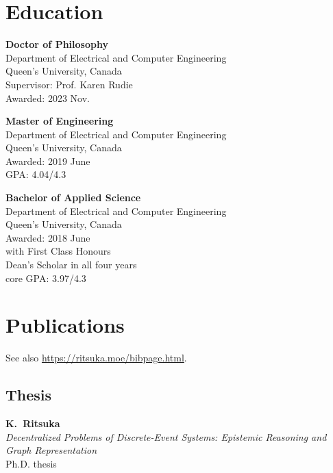 \documentclass[margin]{res}
\begin{document}
\begin{resume}
\section{Education}
\textbf{Doctor of Philosophy}\\
Department of Electrical and Computer Engineering\\
Queen's University, Canada\\
\null\qquad Supervisor: Prof. Karen Rudie\\
\null\qquad Awarded: 2023 Nov.


\textbf{Master of Engineering}\\
Department of Electrical and Computer Engineering \\
Queen's University, Canada\\
\null\qquad Awarded: 2019 June\\
\null\qquad GPA: 4.04/4.3

\textbf{Bachelor of Applied Science}\\
Department of Electrical and Computer Engineering\\
Queen's University, Canada\\
\null\qquad Awarded: 2018 June\\
\null\qquad with First Class Honours \\
\null\qquad \phantom{with} Dean's Scholar in all four years \\
\null\qquad core GPA: 3.97/4.3


\section{Publications}

See also \url{https://ritsuka.moe/bibpage.html}.

\subsection{Thesis}

{\bf K.~Ritsuka}\\
\textit{Decentralized Problems of Discrete-Event Systems:
Epistemic Reasoning and Graph Representation}\\
Ph.D. thesis


\end{resume}
\end{document}
